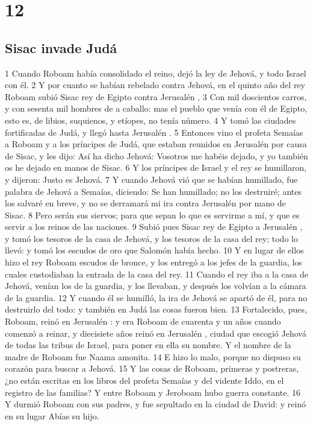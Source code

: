 \chapter{12}

\section*{Sisac invade Judá}

 

1 Cuando Roboam había consolidado el reino, dejó la ley de Jehová, y todo Israel con él.
2 Y por cuanto se habían rebelado contra Jehová, en el quinto año del rey Roboam subió Sisac rey de Egipto contra Jerusalén ,
3 Con mil doscientos carros, y con sesenta mil hombres de a caballo: mas el pueblo que venía con él de Egipto, esto es, de libios, suquienos, y etíopes, no tenía número.
4 Y tomó las ciudades fortificadas de Judá, y llegó hasta Jerusalén .
5 Entonces vino el profeta Semaías a Roboam y a los príncipes de Judá, que estaban reunidos en Jerusalén  por causa de Sisac, y les dijo: Así ha dicho Jehová: Vosotros me habéis dejado, y yo también os he dejado en manos de Sisac.
6 Y los príncipes de Israel y el rey se humillaron, y dijeron: Justo es Jehová.
7 Y cuando Jehová vió que se habían humillado, fue palabra de Jehová a Semaías, diciendo: Se han humillado; no los destruiré; antes los salvaré en breve, y no se derramará mi ira contra Jerusalén por mano de Sisac.
8 Pero serán sus siervos; para que sepan lo que es servirme a mí, y que es servir a los reinos de las naciones.
9 Subió pues Sisac rey de Egipto a Jerusalén , y tomó los tesoros de la casa de Jehová, y los tesoros de la casa del rey; todo lo llevó: y tomó los escudos de oro que Salomón había hecho. 
10 Y en lugar de ellos hizo el rey Roboam escudos de bronce, y los entregó a los jefes de la guardia, los cuales custodiaban la entrada de la casa del rey.
11 Cuando el rey iba a la casa de Jehová, venían los de la guardia, y los llevaban, y después los volvían a la cámara de la guardia.
12 Y cuando él se humilló, la ira de Jehová se apartó de él, para no destruirlo del todo: y también en Judá las cosas fueron bien.
13 Fortalecido, pues, Roboam, reinó en Jerusalén : y era Roboam de cuarenta y un años cuando comenzó a reinar, y diecisiete años reinó en Jerusalén , ciudad que escogió Jehová de todas las tribus de Israel, para poner en ella su nombre. Y el nombre de la  madre de Roboam fue Naama amonita.
14 E hizo lo malo, porque no dispuso su corazón para buscar a Jehová.
15 Y las cosas de Roboam, primeras y postreras, ¿no están escritas en los libros del profeta Semaías y del vidente Iddo, en el registro de las familias? Y entre Roboam y Jeroboam hubo guerra constante. 
16 Y durmió Roboam con sus padres, y fue sepultado en la ciudad de David: y reinó en su lugar Abías su hijo.

